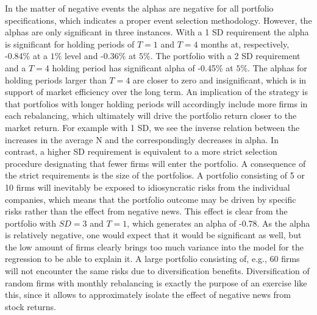 In the matter of negative events the alphas are negative for all portfolio specifications, which indicates a proper event selection methodology. However, the alphas are only significant in three instances. With a 1 SD requirement the alpha is significant for holding periods of $T = 1$ and $T = 4$ months at, respectively, -0.84\% at a $1\%$ level and -0.36\% at $5\%$. The portfolio with a 2 SD requirement and a $T=4$ holding period has significant alpha of -0.45\% at $5\%$. The alphas for holding periods larger than $T = 4$ are closer to zero and insignificant, which is in support of market efficiency over the long term. An implication of the strategy is that portfolios with longer holding periods will accordingly include more firms in each rebalancing, which ultimately will drive the portfolio return closer to the market return. For example with 1 SD, we see the inverse relation between the increases in the average N and the correspondingly decreases in alpha. In contrast, a higher SD requirement is equivalent to a more strict selection procedure designating that fewer firms will enter the portfolio. A consequence of the strict requirements is the size of the portfolios. A portfolio consisting of 5 or 10 firms will inevitably be exposed to idiosyncratic risks from the individual companies, which means that the portfolio outcome may be driven by specific risks rather than the effect from negative news. This effect is clear from the portfolio with $SD = 3$ and $T=1$, which generates an alpha of -0.78. As the alpha is relatively negative, one would expect that it would be significant as well, but the low amount of firms clearly brings too much variance into the model for the regression to be able to explain it. A large portfolio consisting of, e.g., 60 firms will not encounter the same risks due to diversification benefits. Diversification of random firms with monthly rebalancing is exactly the purpose of an exercise like this, since it allows to approximately isolate the effect of negative news from stock returns. 

